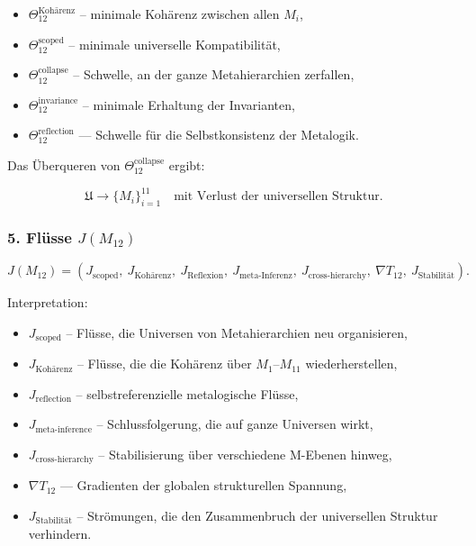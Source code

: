 \begin{itemize}
    \item $\Theta_{12}^{\mathrm{Kohärenz}}$ – minimale Kohärenz zwischen allen $M_i$,
    \item $\Theta_{12}^{\mathrm{scoped}}$ – minimale universelle Kompatibilität,
    \item $\Theta_{12}^{\mathrm{collapse}}$ – Schwelle, an der ganze Metahierarchien zerfallen,
    \item $\Theta_{12}^{\mathrm{invariance}}$ – minimale Erhaltung der Invarianten,
    \item $\Theta_{12}^{\mathrm{reflection}}$ — Schwelle für die Selbstkonsistenz der Metalogik.
\end{itemize}

Das Überqueren von $\Theta_{12}^{\mathrm{collapse}}$ ergibt:

\[
\mathfrak{U} \to \{ M_i \}_{i=1}^{11}
\quad\text{mit Verlust der universellen Struktur}.
\]

\subsubsection*{5. Flüsse $J(M_{12})$}

\[
J(M_{12})=
(
J_{\mathrm{scoped}},\
J_{\mathrm{Kohärenz}},\
J_{\mathrm{Reflexion}},\
J_{\mathrm{meta\mbox{-}Inferenz}},\
J_{\mathrm{cross\mbox{-}hierarchy}},\
\nabla T_{12},\
J_{\mathrm{Stabilität}}
).
\]

Interpretation:

\begin{itemize}
    \item $J_{\mathrm{scoped}}$ – Flüsse, die Universen von Metahierarchien neu organisieren,
    \item $J_{\mathrm{Kohärenz}}$ – Flüsse, die die Kohärenz über $M_1$–$M_{11}$ wiederherstellen,
    \item $J_{\mathrm{reflection}}$ – selbstreferenzielle metalogische Flüsse,
    \item $J_{\mathrm{meta\mbox{-}inference}}$ – Schlussfolgerung, die auf ganze Universen wirkt,
    \item $J_{\mathrm{cross\mbox{-}hierarchy}}$ – Stabilisierung über verschiedene M-Ebenen hinweg,
    \item $\nabla T_{12}$ — Gradienten der globalen strukturellen Spannung,
    \item $J_{\mathrm{Stabilität}}$ – Strömungen, die den Zusammenbruch der universellen Struktur verhindern.
\end{itemize}

